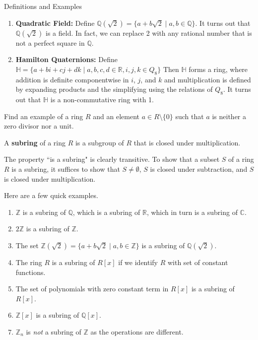 \begin{section}{Definitions and Examples}
\begin{example}
\begin{enumerate}[label=\rm{(\alph*)}]
\item \textbf{Quadratic Field:} Define $\mathbb{Q}(\sqrt{2})=\{a+b\sqrt{2}\mid a,b\in\mathbb{Q}\}$.  It turns out that $\mathbb{Q}(\sqrt{2})$ is a field.  In fact, we can replace 2 with any rational number that is not a perfect square in $\mathbb{Q}$.
\item \textbf{Hamilton Quaternions:} Define $\mathbb{H}=\{a+bi+cj+dk\mid a,b,c,d\in\mathbb{R}, i,j,k\in Q_8\}$  Then $\mathbb{H}$ forms a ring, where addition is definite componentwise in $i$, $j$, and $k$ and multiplication is defined by expanding products and the simplifying using the relations of $Q_8$.  It turns out that $\mathbb{H}$ is a non-commutative ring with 1.
\end{enumerate}
\end{example}

\begin{exercise}
Find an example of a ring $R$ and an element $a\in R\setminus\{0\}$ such that $a$ is neither a zero divisor nor a unit.
\end{exercise}

\begin{definition}
A \textbf{subring} of a ring $R$ is a subgroup of $R$ that is closed under multiplication.
\end{definition}

\begin{remark}
The property ``is a subring" is clearly transitive. To show that a subset $S$ of a ring $R$ is a subring, it suffices to show that $S\neq \emptyset$, $S$ is closed under subtraction, and $S$ is closed under multiplication.
\end{remark}

\begin{example}
Here are a few quick examples.
\begin{enumerate}[label=\rm{(\alph*)}]
\item $\mathbb{Z}$ is a subring of $\mathbb{Q}$, which is a subring of $\mathbb{R}$, which in turn is a subring of $\mathbb{C}$.
\item $2\mathbb{Z}$ is a subring of $\mathbb{Z}$.
\item The set $\mathbb{Z}(\sqrt{2})=\{a+b\sqrt{2}\mid a,b\in\mathbb{Z}\}$ is a subring of $\mathbb{Q}(\sqrt{2})$.
\item The ring $R$ is a subring of $R[x]$ if we identify $R$ with set of constant functions.
\item The set of polynomials with zero constant term in $R[x]$ is a subring of $R[x]$.
\item $\mathbb{Z}[x]$ is a subring of $\mathbb{Q}[x]$.
\item $\mathbb{Z}_n$ is \emph{not} a subring of $\mathbb{Z}$ as the operations are different.
\end{enumerate} 
\end{example}


\end{section}
